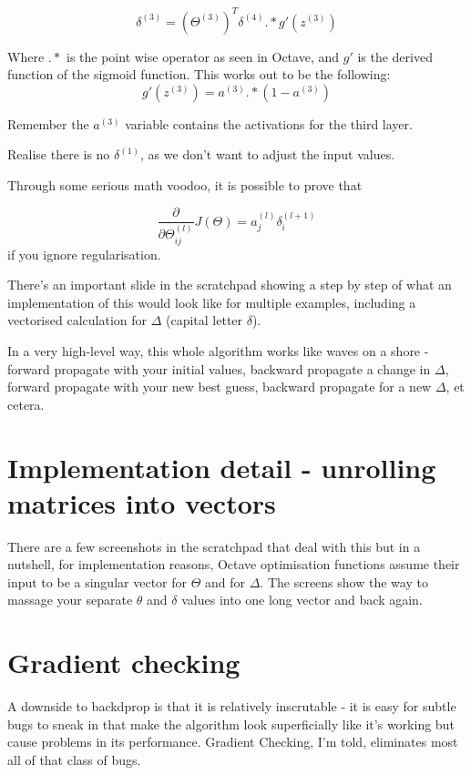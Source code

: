 \begin{equation}
	\delta^{(3)} = (\Theta^{(3)})^T \delta^{(4)} .* g'(z^{(3)})
\end{equation}

Where $.*$ is the point wise operator as seen in Octave, and $g'$ is the derived function of the sigmoid function. This works out to be the following:
\[
g'(z^{(3)}) = a^{(3)} .* (1 - a^{(3)})
\]

Remember the $a^{(3)}$ variable contains the activations for the third layer.

Realise there is no $\delta^{(1)}$, as we don't want to adjust the input values.

Through some serious math voodoo, it is possible to prove that

\begin{equation}
\frac{\partial}{\partial\Theta^{(l)}_{ij}}J(\Theta) = 
a_j^{(l)}\delta_i^{(l + 1)}
\end{equation}
if you ignore regularisation.

There's an important slide in the scratchpad showing a step by step of what an implementation of this would look like for multiple examples, including a vectorised calculation for $\Delta$ (capital letter $\delta$).

In a very high-level way, this whole algorithm works like waves on a shore - forward propagate with your initial values, backward propagate a change in $\Delta$, forward propagate with your new best guess, backward propagate for a new $\Delta$, et cetera.

\section{Implementation detail - unrolling matrices into vectors}

There are a few screenshots in the scratchpad that deal with this but in a nutshell, for implementation reasons, Octave optimisation functions assume their input to be a singular vector for $\Theta$ and for $\Delta$. The screens show the way to massage your separate $\theta$ and $\delta$ values into one long vector and back again.

\section{Gradient checking}

A downside to backdprop is that it is relatively inscrutable - it is easy for subtle bugs to sneak in that make the algorithm look superficially like it's working but cause problems in its performance. Gradient Checking, I'm told, eliminates most all of that class of bugs.

